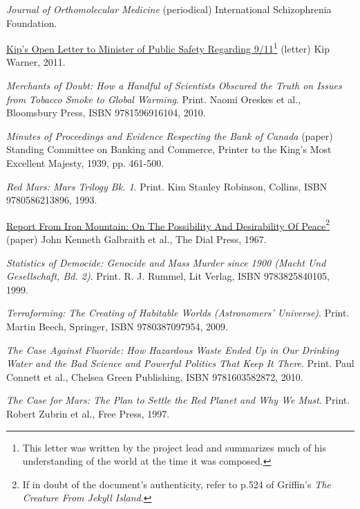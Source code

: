 \item
{\it Journal of Orthomolecular Medicine} (periodical)\crlf
International Schizophrenia Foundation.

\item
\href{http://www.thevertigo.com/html/9-11/}{Kip's Open Letter to Minister of Public Safety Regarding 9/11}\footnote{This letter was written by the project lead and summarizes much of his understanding of the world at the time it was composed.} (letter)\crlf
Kip Warner, 2011.

\item
{\it Merchants of Doubt: How a Handful of Scientists Obscured the Truth on Issues from Tobacco Smoke to Global Warming}. Print.\crlf
Naomi Oreskes et al., Bloomsbury Press, ISBN 9781596916104, 2010.

\item
{\it Minutes of Proceedings and Evidence Respecting the Bank of Canada} (paper)\crlf
Standing Committee on Banking and Commerce, Printer to the King's Most Excellent Majesty, 1939, pp. 461-500.

\item
{\it Red Mars: Mars Trilogy Bk. 1}. Print.\crlf
Kim Stanley Robinson, Collins, ISBN 9780586213896, 1993.

\item
\href{http://www.teachpeace.com/Report_from_Iron_Mountain.pdf}{Report From Iron Mountain: On The Possibility And Desirability Of Peace}\footnote{If in doubt of the document's authenticity, refer to p.524 of Griffin's {\it The Creature From Jekyll Island}.} (paper)\crlf
John Kenneth Galbraith et al., The Dial Press, 1967.

\item
{\it Statistics of Democide: Genocide and Mass Murder since 1900 (Macht Und Gesellschaft, Bd. 2)}. Print.\crlf
R. J. Rummel, Lit Verlag, ISBN 9783825840105, 1999.

\item
{\it Terraforming: The Creating of Habitable Worlds (Astronomers' Universe)}. Print.\crlf
Martin Beech, Springer, ISBN 9780387097954, 2009.

\item
{\it The Case Against Fluoride: How Hazardous Waste Ended Up in Our Drinking Water and the Bad Science and Powerful Politics That Keep It There}. Print.\crlf
Paul Connett et al., Chelsea Green Publishing, ISBN 9781603582872, 2010.

\item
{\it The Case for Mars: The Plan to Settle the Red Planet and Why We Must}. Print.\crlf
Robert Zubrin et al., Free Press, 1997.


